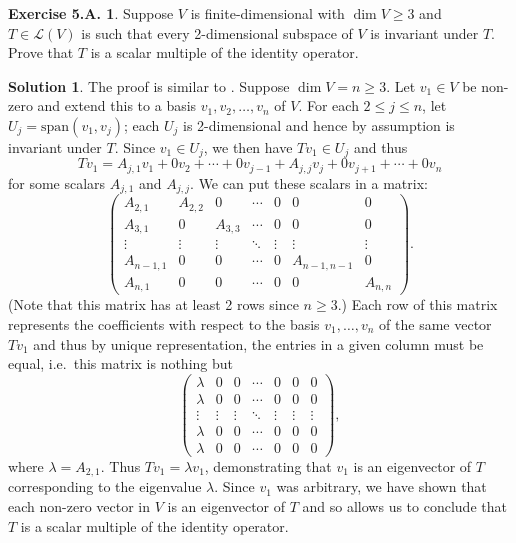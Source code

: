 \documentclass[12pt]{article}
\theoremstyle{definition}
\theoremstyle{exercise}
\newtheorem{exercise}{Exercise 5.A.}
\theoremstyle{solution}
\newtheorem*{solution}{Solution}
\newcommand{\lmap}{\mathcal{L}}
\newcommand{\Span}{\text{span}}
\begin{document}
\begin{exercise}
\label{ex:28}
    Suppose \( V \) is finite-dimensional with \( \dim V \geq 3 \) and \( T \in \lmap(V) \) is such that every 2-dimensional subspace of \( V \) is invariant under \( T \). Prove that \( T \) is a scalar multiple of the identity operator.
\end{exercise}

\begin{solution}
    The proof is similar to . Suppose \( \dim V = n \geq 3 \). Let \( v_1 \in V \) be non-zero and extend this to a basis \( v_1, v_2, \ldots, v_n \) of \( V \). For each \( 2 \leq j \leq n \), let \( U_j = \Span(v_1, v_j) \); each \( U_j \) is 2-dimensional and hence by assumption is invariant under \( T \). Since \( v_1 \in U_j \), we then have \( Tv_1 \in U_j \) and thus
    \[
        Tv_1 = A_{j,1} v_1 + 0 v_2 + \cdots + 0 v_{j-1} + A_{j,j} v_j + 0 v_{j+1} + \cdots + 0 v_n
    \]
    for some scalars \( A_{j,1} \) and \( A_{j,j} \). We can put these scalars in a matrix:
    \[
        \begin{pmatrix}
            A_{2,1} & A_{2,2} & 0 & \cdots & 0 & 0 & 0 \\
            A_{3,1} & 0 & A_{3,3} & \cdots & 0 & 0 & 0 \\
            \vdots & \vdots & \vdots & \ddots & \vdots & \vdots & \vdots \\
            A_{n-1,1} & 0 & 0 & \cdots & 0 & A_{n-1,n-1} & 0 \\
            A_{n,1} & 0 & 0 & \cdots & 0 & 0 & A_{n,n}
        \end{pmatrix}.
    \]
    (Note that this matrix has at least 2 rows since \( n \geq 3 \).) Each row of this matrix represents the coefficients with respect to the basis \( v_1, \ldots, v_n \) of the same vector \( Tv_1 \) and thus by unique representation, the entries in a given column must be equal, i.e.\ this matrix is nothing but
    \[
        \begin{pmatrix}
            \lambda & 0 & 0 & \cdots & 0 & 0 & 0 \\
            \lambda & 0 & 0 & \cdots & 0 & 0 & 0 \\
            \vdots & \vdots & \vdots & \ddots & \vdots & \vdots & \vdots \\
            \lambda & 0 & 0 & \cdots & 0 & 0 & 0 \\
            \lambda & 0 & 0 & \cdots & 0 & 0 & 0
        \end{pmatrix},
    \]
    where \( \lambda = A_{2,1} \). Thus \( Tv_1 = \lambda v_1 \), demonstrating that \( v_1 \) is an eigenvector of \( T \) corresponding to the eigenvalue \( \lambda \). Since \( v_1 \) was arbitrary, we have shown that each non-zero vector in \( V \) is an eigenvector of \( T \) and so  allows us to conclude that \( T \) is a scalar multiple of the identity operator.
\end{solution}
\end{document}
